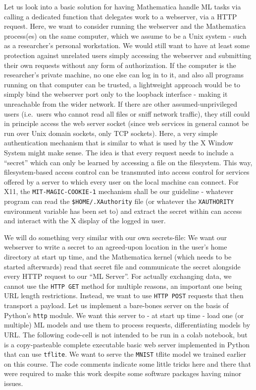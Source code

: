 \documentclass[11pt]{article}
\begin{document}
Let us look into a basic solution for having Mathematica handle ML tasks
via calling a dedicated function that delegates work to a webserver, via
a HTTP request. Here, we want to consider running the webserver and the
Mathematica process(es) on the same computer, which we assume to be a
Unix system - such as a researcher's personal workstation. We would
still want to have at least some protection against unrelated users
simply accessing the webserver and submitting their own requests without
any form of authorization. If the computer is the researcher's private
machine, no one else can log in to it, and also all programs running on
that computer can be trusted, a lightweight approach would be to simply
bind the webserver port only to the loopback interface - making it
unreachable from the wider network. If there are other
assumed-unprivileged users (i.e.~users who cannot read all files or
sniff network traffic), they still could in principle access the web
server socket (since web services in general cannot be run over Unix
domain sockets, only TCP sockets). Here, a very simple authentication
mechanism that is similar to what is used by the X Window System might
make sense. The idea is that every request needs to include a ``secret''
which can only be learned by accessing a file on the filesystem. This
way, filesystem-based access control can be transmuted into access
control for services offered by a server to which every user on the
local machine can connect. For X11, the \texttt{MIT-MAGIC-COOKIE-1}
mechanism shall be our guideline - whatever program can read the
\texttt{\$HOME/.XAuthority} file (or whatever the \texttt{XAUTHORITY}
environment variable has been set to) and extract the secret within can
access and interact with the X display of the logged in user.

We will do something very similar with our own secrets-file: We want our
webserver to write a secret to an agreed-upon location in the user's
home directory at start up time, and the Mathematica kernel (which needs
to be started afterwards) read that secret file and communicate the
secret alongside every HTTP request to our ``ML Server''. For actually
exchanging data, we cannot use the \texttt{HTTP\ GET} method for
multiple reasons, an important one being URL length restrictions.
Instead, we want to use \texttt{HTTP\ POST} requests that then transport
a payload. Let us implement a bare-bones server on the basis of Python's
\texttt{http} module. We want this server to - at start up time - load
one (or multiple) ML models and use them to process requests,
differentiating models by URL. The following code-cell is not intended
to be run in a colab notebook, but is a copy-pasteable complete
executable basic web server implemented in Python that can use
\texttt{tflite}. We want to serve the \texttt{MNIST} tflite model we
trained earlier on this course. The code comments indicate some little
tricks here and there that were required to make this work despite some
software packages having minor issues.
\end{document}
